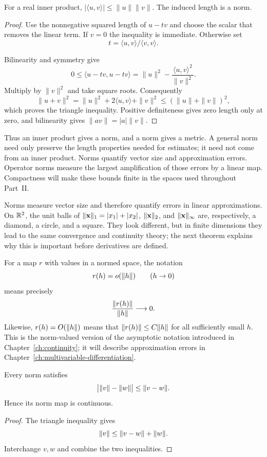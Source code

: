 \begin{theorem}
For a real inner product, $|\langle u,v\rangle|\leq\|u\|\|v\|$.
The induced length is a norm.
\end{theorem}
\begin{proof}
Use the nonnegative squared length of $u-tv$ and
choose the scalar that removes the linear term. If $v=0$ the inequality
is immediate. Otherwise set
\[
t=\langle u,v\rangle/\langle v,v\rangle.
\]

Bilinearity and symmetry give
\[
0\leq\langle u-tv,u-tv\rangle
=\|u\|^2-\frac{\langle u,v\rangle^2}{\|v\|^2}.
\]
Multiply by $\|v\|^2$ and take square roots. Consequently
\[
\|u+v\|^2=\|u\|^2+2\langle u,v\rangle+\|v\|^2
\leq(\|u\|+\|v\|)^2,
\]
which proves the triangle inequality. Positive definiteness gives zero
length only at zero, and bilinearity gives $\|av\|=|a|\|v\|$.
\end{proof}
Thus an inner product gives a norm, and a norm gives a metric. A general
norm need only preserve the length properties needed for estimates; it
need not come from an inner product.
\label{sec:normed-spaces}
Norms quantify vector size and approximation errors. Operator norms measure
the largest amplification of those errors by a linear map. Compactness will
make these bounds finite in the spaces used throughout Part~II.



Norms measure vector size and therefore quantify errors in linear
approximations.  On $\mathbb{R}^2$, the unit balls of
$\lVert \mathbf{x}\rVert_1=|x_1|+|x_2|$, $\lVert \mathbf{x}\rVert_2$, and $\lVert \mathbf{x}\rVert_\infty$ are,
respectively, a diamond, a circle, and a square.  They look different, but
in finite dimensions they lead to the same convergence and continuity
theory; the next theorem explains why this is important before derivatives
are defined.

For a map $r$ with values in a normed space, the notation
\[
r(h)=o(\lVert h\rVert)
\qquad(h\to0)
\]
means precisely
\[
\frac{\lVert r(h)\rVert}{\lVert h\rVert}\longrightarrow0.
\]
Likewise, $r(h)=O(\lVert h\rVert)$ means that
$\lVert r(h)\rVert\leq C\lVert h\rVert$ for all sufficiently small $h$.  This is the
norm-valued version of the asymptotic notation introduced in
Chapter~\ref{ch:continuity}; it will describe approximation errors in
Chapter~\ref{ch:multivariable-differentiation}.


\begin{proposition}
\label{prop:reverse-triangle}
Every norm satisfies
\[
\bigl\lvert\lVert v\rVert-\lVert w\rVert\bigr\rvert\leq\lVert v-w\rVert.
\]
Hence its norm map is continuous.
\end{proposition}
\begin{proof}
The triangle inequality gives
\[
\lVert v\rVert\leq\lVert v-w\rVert+\lVert w\rVert.
\]
Interchange $v,w$ and combine the two inequalities.
\end{proof}

